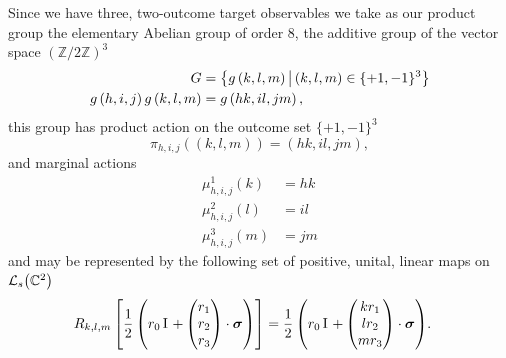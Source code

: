 Since we have three, two-outcome target observables we take as our product group the elementary Abelian group of order $8$, the additive group of the vector space $\left(\mathbb{Z}/2\mathbb{Z}\right)^3$
\begin{align}
  G &= \left\{g\left({k}, {l}, {m}\right)\,\middle|\,(k,l,m)\in \{+1, -1\}^3\right\}\\
  g\left({h}, {i}, {j}\right) g\left({k}, {l}, {m}\right) &= g\left({hk}, {il}, {jm}\right),
\end{align}
this group has product action on the outcome set $\{+1,-1\}^3$
\begin{equation}
  \pi_{h,i,j}\left((k,l,m)\right) = (hk,il,jm),
\end{equation}
and marginal actions
\begin{align}
  \mu^1_{h,i,j} \left(k\right) &= hk\\
  \mu^2_{h,i,j} \left(l\right) &= il\\
  \mu^3_{h,i,j} \left(m\right) &= jm
\end{align}
and may be represented by the following set of positive, unital, linear maps on $\saops[\mathbb{C}^2]$
\begin{align}
  \map{k}{l}{m}\left[\qbit[r_0]{\begin{pmatrix}r_1\\r_2\\r_3\end{pmatrix}}\right] &= \qbit[r_0]{\begin{pmatrix}k r_1\\l r_2\\m r_3\end{pmatrix}}.
\end{align}

